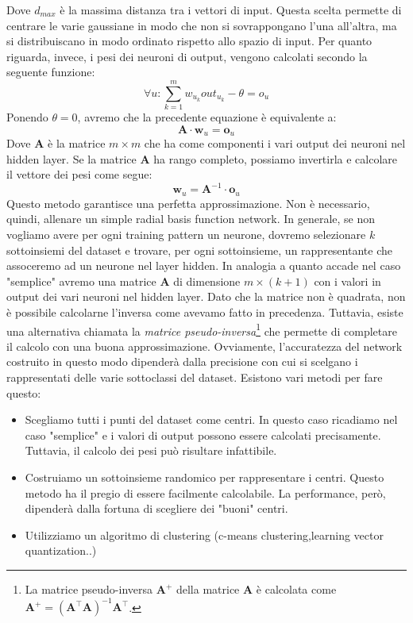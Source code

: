 \documentclass[10pt,a4paper]{article}
\newcommand{\ww}{\mathbf{w}}
\newcommand{\oo}{\mathbf{o}}
\begin{document}
Dove $d_{max}$ è la massima distanza tra i vettori di input. Questa scelta permette di centrare le varie gaussiane in modo che non si sovrappongano l'una all'altra, ma si distribuiscano in modo ordinato rispetto allo spazio di input. Per quanto riguarda, invece, i pesi dei neuroni di output, vengono calcolati secondo la seguente funzione:
$$
\forall u: \sum_{k=1}^m w_{u_k} out_{u_k} - \theta  = o_u
$$
Ponendo $\theta = 0$, avremo che la precedente equazione è equivalente a:
$$ 
\mathbf{A}\cdot \ww_u = \oo_u
$$
Dove $\mathbf{A}$ è la matrice $m \times m$ che ha come componenti i vari output dei neuroni nel hidden layer. Se la matrice $\mathbf{A}$ ha rango completo, possiamo invertirla e calcolare il vettore dei pesi come segue:
$$
\ww_u = \mathbf{A}^{-1}\cdot \oo_u
$$
Questo metodo garantisce una perfetta approssimazione. Non è necessario, quindi, allenare un simple radial basis function network. In generale, se non vogliamo avere per ogni training pattern un neurone, dovremo selezionare $k$ sottoinsiemi del dataset e trovare, per ogni sottoinsieme, un rappresentante che  assoceremo ad un neurone nel layer hidden. In analogia a quanto accade nel caso "semplice" avremo una matrice $\mathbf{A}$ di dimensione $m\times (k+1)$ con i valori in output dei vari neuroni nel hidden layer. Dato che la matrice non è quadrata, non è possibile calcolarne l'inversa come avevamo fatto in precedenza. Tuttavia, esiste una alternativa chiamata la \emph{matrice pseudo-inversa}\footnote{La matrice pseudo-inversa $\mathbf{A}^+$ della matrice $\mathbf{A}$ è calcolata come $\mathbf{A}^+ = (\mathbf{A}^{\top}\mathbf{A})^{-1}\mathbf{A}^{\top}$.} che permette di completare il calcolo con una buona approssimazione. Ovviamente, l'accuratezza del network costruito in questo modo dipenderà dalla precisione con cui si scelgano i rappresentati delle varie sottoclassi del dataset. Esistono vari metodi per fare questo:
\begin{itemize}
\item{Scegliamo tutti i punti del dataset come centri. In questo caso ricadiamo nel caso "semplice" e i valori di output possono essere calcolati precisamente. Tuttavia, il calcolo dei pesi può risultare infattibile.}
\item{Costruiamo un sottoinsieme randomico per rappresentare i centri. Questo metodo ha il pregio di essere facilmente calcolabile. La performance, però, dipenderà dalla fortuna di scegliere dei "buoni" centri.}
\item{Utilizziamo un algoritmo di clustering (c-means clustering,learning vector quantization..)}
\end{itemize}
\end{document}
